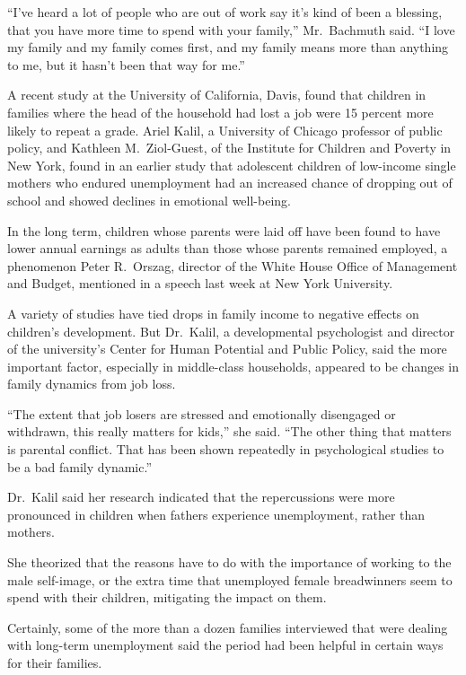 ﻿\documentclass[12pt]{article}
\begin{document}
``I've heard a lot of people who are out of work say it's kind of been a blessing, that you have
more time to spend with your family,'' Mr.~Bachmuth said. ``I love my family and my family comes
first, and my family means more than anything to me, but it hasn't been that way for me.''

A recent study at the University of California, Davis, found that children in families where the
head of the household had lost a job were 15 percent more likely to repeat a grade. Ariel Kalil, a
University of Chicago professor of public policy, and Kathleen M.~Ziol-Guest, of the Institute for
Children and Poverty in New York, found in an earlier study that adolescent children of low-income
single mothers who endured unemployment had an increased chance of dropping out of school and showed
declines in emotional well-being.

In the long term, children whose parents were laid off have been found to have lower annual earnings
as adults than those whose parents remained employed, a phenomenon Peter R.~Orszag, director of the
White House Office of Management and Budget, mentioned in a speech last week at New York University.

A variety of studies have tied drops in family income to negative effects on children's development.
But Dr.~Kalil, a developmental psychologist and director of the university's Center for Human
Potential and Public Policy, said the more important factor, especially in middle-class households,
appeared to be changes in family dynamics from job loss.

``The extent that job losers are stressed and emotionally disengaged or withdrawn, this really
matters for kids,'' she said. ``The other thing that matters is parental conflict. That has been
shown repeatedly in psychological studies to be a bad family dynamic.''

Dr.~Kalil said her research indicated that the repercussions\cite{repercussion} were more pronounced
in children when fathers experience unemployment, rather than mothers.

She theorized that the reasons have to do with the importance of working to the male self-image, or
the extra time that unemployed female breadwinners seem to spend with their children, mitigating the
impact on them.

Certainly, some of the more than a dozen families interviewed that were dealing with long-term
unemployment said the period had been helpful in certain ways for their families.
\end{document}

